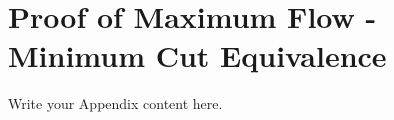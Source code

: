 
\chapter{Proof of Maximum Flow - Minimum Cut Equivalence} %

\label{AppendixA} %

Write your Appendix content here.
